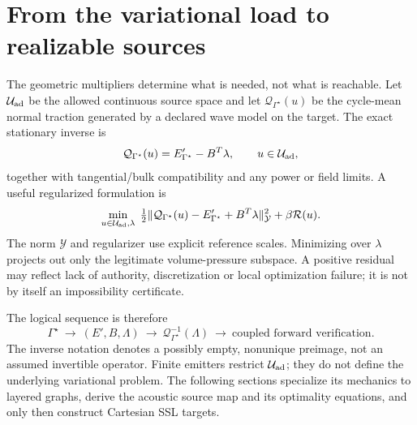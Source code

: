\section{From the variational load to realizable sources}
\label{sec:mf-source-inverse}
The geometric multipliers determine what is needed, not what is reachable.
Let $\mathcal U_{\rm ad}$ be the allowed continuous source space and let
$\mathcal Q_{\Gamma^\star}(u)$ be the cycle-mean normal traction generated
by a declared wave model on the target. The exact stationary inverse is
\begin{equation}\label{eq:mf-source-equality}
 \mathcal Q_{\Gamma^\star}(u)=E'_{\Gamma^\star}-B^T\lambda,
 \qquad u\in\mathcal U_{\rm ad},
\end{equation}
together with tangential/bulk compatibility and any power or field limits.
A useful regularized formulation is
\begin{equation}\label{eq:mf-source-minimum}
 \min_{u\in\mathcal U_{\rm ad},\lambda}\;
 \tfrac12\|\mathcal Q_{\Gamma^\star}(u)-E'_{\Gamma^\star}
 +B^T\lambda\|_{\mathcal Y}^2+\beta\mathcal R(u).
\end{equation}
The norm $\mathcal Y$ and regularizer use explicit reference scales. Minimizing
over $\lambda$ projects out only the legitimate volume-pressure subspace.
A positive residual may reflect lack of authority, discretization or local
optimization failure; it is not by itself an impossibility certificate.

The logical sequence is therefore
\begin{equation}\label{eq:mf-sequence}
 \Gamma^\star\ \longrightarrow\ (E',B,\Lambda)
 \ \longrightarrow\ \mathcal Q_{\Gamma^\star}^{-1}(\Lambda)
 \ \longrightarrow\ \text{coupled forward verification}.
\end{equation}
The inverse notation denotes a possibly empty, nonunique preimage, not an
assumed invertible operator. Finite emitters restrict $\mathcal U_{\rm ad}$;
they do not define the underlying variational problem. The following sections
specialize its mechanics to layered graphs, derive the acoustic source map
and its optimality equations, and only then construct Cartesian SSL targets.
